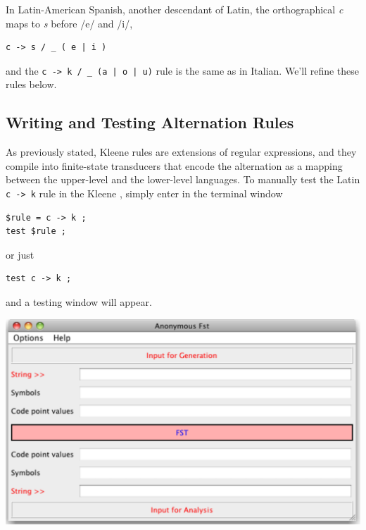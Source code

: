 In Latin-American Spanish, another descendant of Latin, the orthographical \emph{c} maps to \emph{s} before /e/ and /i/, 

\begin{Verbatim}
c -> s / _ ( e | i )
\end{Verbatim}

\noindent
and the \verb!c -> k / _ (a | o | u)! rule is the same as in Italian.  We'll refine these rules below.

\subsection{Writing and Testing Alternation Rules}

As previously stated, Kleene rules are extensions of 
regular expressions, and they compile into finite-state
transducers that encode the alternation as a mapping between the
upper-level and the lower-level languages.  To manually test the Latin \texttt{c -> k} rule in the Kleene , simply
enter in the terminal window

\begin{Verbatim}
$rule = c -> k ;
test $rule ;
\end{Verbatim}

\noindent
or just


\begin{Verbatim}
test c -> k ;
\end{Verbatim}


\noindent
and a testing window will appear.

\vspace{0.3cm}

\begin{center}
\includegraphics[width=\textwidth]{images/testWindow.pdf}
\end{center}

